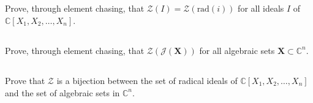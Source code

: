 \documentclass[10pt]{amsart}
\newcommand{\C}{\mathbb{C}}
\newcommand{\rad}[1]{\text{rad}\left(#1\right)}
\begin{document}
\subsection{}%
\label{sub:4b}

Prove, through element chasing, that $\mathscr{Z}(I)=\mathscr{Z}(\rad{i})$ for
all ideals $I$ of $\C[X_1,X_2,\ldots,X_n]$.

\subsection{}%
\label{sub:4c}

Prove, through element chasing, that $\mathscr{Z}(\mathscr{J}(\mathbf{X}))$ for
all algebraic sets $\mathbf{X}\subset\C^n$.

\subsection{}%
\label{sub:4d}

Prove that $\mathscr{Z}$ is a bijection between the set of radical ideals of
$\C[X_1,X_2,\ldots,X_n]$ and the set of algebraic sets in $\C^n$.
\end{document}
